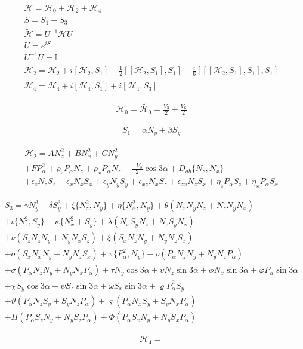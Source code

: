 \documentclass[fleqn]{article}
\begin{document}
\begin{gather}
\mathscr{H} = \mathscr{H}_0 + \mathscr{H}_2 + \mathscr{H}_4 \\
S = S_1 + S_3 \\
\tilde{\mathscr{H}} = U^{-1} \mathscr{H} U \\
U = e^{iS} \\
U^{-1}U = \mathbb{I} \\
\tilde{\mathscr{H}}_2 = \mathscr{H}_2 + i[\mathscr{H}_2,S_1] - \frac{1}{2}[[\mathscr{H}_2,S_1], S_1] - \frac{i}{6}[[[\mathscr{H}_2,S_1], S_1],S_1] \\
\tilde{\mathscr{H}}_4 = \mathscr{H}_4 + i[\mathscr{H}_4,S_1] + i[\mathscr{H}_4,S_3]
\end{gather}

\begin{gather}
\mathscr{H}_0 = \tilde{\mathscr{H}_0} = \frac{V_{3}}{2} + \frac{V_{6}}{2}
\end{gather}


\begin{gather}
S_1 = \alpha N_y + \beta S_y 
\end{gather}

\begin{gather}
\mathscr{H}_2 = AN_z^2 + BN_x^2 + CN_y^2 \\
+ FP_\alpha^2 + \rho_z P_\alpha N_z + \rho_x P_\alpha N_z + \frac{-V_3}{2} \cos3\alpha + D_{ab} \{N_z,N_x\} \\
+ \epsilon_z N_z S_z + \epsilon_x N_x S_x + \epsilon_y N_y S_y + \epsilon_{xz} N_x S_z + \epsilon_{zx} N_z S_x + \eta_z P_\alpha S_z + \eta_x P_\alpha S_x
\end{gather}

\begin{gather}
S_3 = \gamma N_y^3 + \delta S_y^3 + \zeta \{N_z^2,N_y\} + \eta \{N_x^2,N_y\} + \theta(N_x N_y N_z + N_z N_y N_x)\\
+ \iota \{N_z^2, S_y\} + \kappa \{N_x^2 + S_y\} + \lambda (N_x S_y N_z + N_z S_y N_x) \\
 + \nu (S_z N_z N_y + N_y N_x S_z) + \xi (S_x N_z N_y + N_y N_z S_x) \\
 + o (S_x N_x N_y + N_y N_z S_x) + \pi \{P_\alpha^2, N_y\} + \rho (P_\alpha N_z N_y + N_y N_z P_\alpha) \\
 + \sigma (P_\alpha N_z N_y + N_y N_x P_\alpha) + \tau N_y \cos3\alpha + \upsilon N_z \sin3\alpha + \phi N_x \sin3\alpha + \varphi P_\alpha \sin3\alpha \\
+ \chi S_y \cos3\alpha + \psi S_z \sin3\alpha + \omega S_x \sin3\alpha + \varrho P_\alpha^2 S_y \\
+ \vartheta (P_\alpha N_z S_y + S_y N_z P_\alpha) + \varsigma (P_\alpha N_x S_y + S_y N_x P_\alpha) \\
 + \Pi(P_\alpha S_z N_y + N_y S_z P_\alpha) + \Phi(P_\alpha S_x N_y + N_y S_x P_\alpha)
\end{gather}

\begin{gather}
\mathscr{H}_4 = \\
\end{gather}
\end{document}
